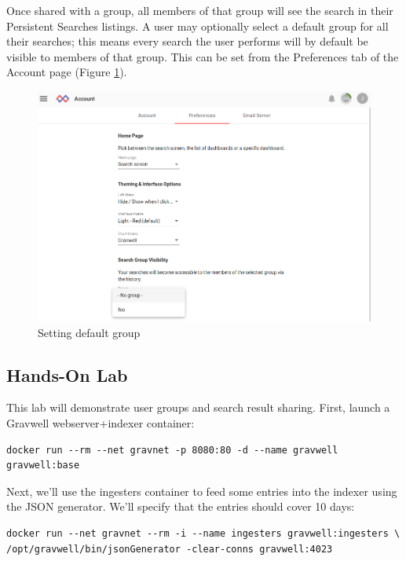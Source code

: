 Once shared with a group, all members of that group will see the search
in their Persistent Searches listings. A user may optionally select a
default group for all their searches; this means every search the user
performs will by default be visible to members of that group. This can
be set from the Preferences tab of the Account page (Figure \ref{fig:default-group}).

\begin{figure}
	\includegraphics{images/default-group.png}
	\caption{Setting default group}
	\label{fig:default-group}
\end{figure}

\subsection{Hands-On Lab}

This lab will demonstrate user groups and search result sharing. First,
launch a Gravwell webserver+indexer container:

\begin{Verbatim}[breaklines=true]
docker run --rm --net gravnet -p 8080:80 -d --name gravwell gravwell:base
\end{Verbatim}

Next, we'll use the ingesters container to feed some entries into the
indexer using the JSON generator. We'll specify that the entries should
cover 10 days:

\begin{Verbatim}[breaklines=true]
docker run --net gravnet --rm -i --name ingesters gravwell:ingesters \
/opt/gravwell/bin/jsonGenerator -clear-conns gravwell:4023
\end{Verbatim}

